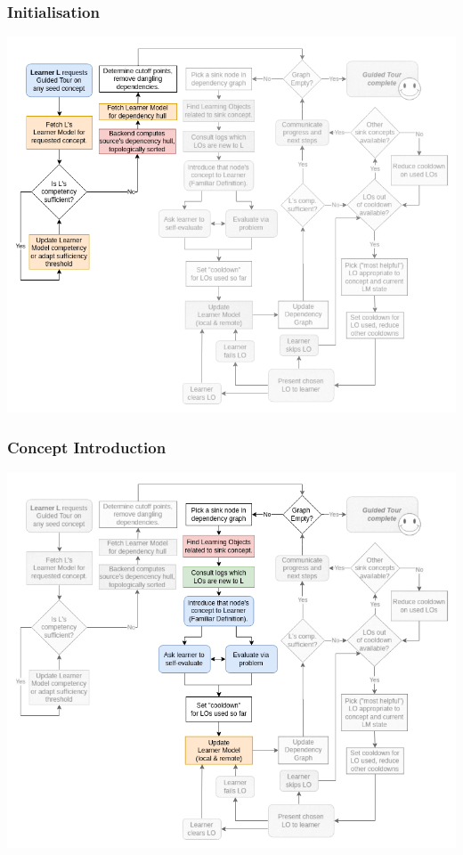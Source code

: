 \documentclass[aspectratio=169, usenames, dvipsnames]{beamer}
\begin{document}
\begin{frame}
\frametitle{Initialisation}
\begin{minipage}{0.7\textwidth}
\vspace*{-10px}
\includegraphics[height=0.9\textheight,keepaspectratio]{images/gt_algorithm_square_step1}
\end{minipage}%
\begin{minipage}{0.3\textwidth}
\end{minipage}%
\end{frame}

\begin{frame}
\frametitle{Concept Introduction}
\begin{minipage}{0.7\textwidth}
\vspace*{-10px}
\includegraphics[height=0.9\textheight,keepaspectratio]{images/gt_algorithm_square_step2}
\end{minipage}%
\begin{minipage}{0.3\textwidth}
\end{minipage}%
\end{frame}
\end{document}
